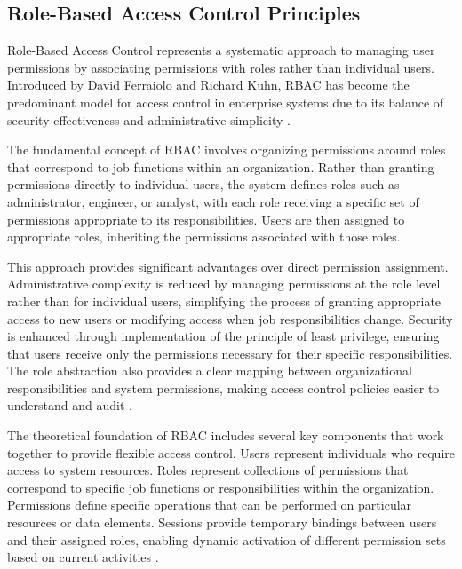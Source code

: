 \subsection{Role-Based Access Control Principles}
\label{subsec:rbac-principles}

Role-Based Access Control represents a systematic approach to managing user permissions by associating permissions with roles rather than individual users. Introduced by David Ferraiolo and Richard Kuhn, \ac{RBAC} has become the predominant model for access control in enterprise systems due to its balance of security effectiveness and administrative simplicity \cite{sandhu1998role}.

The fundamental concept of \ac{RBAC} involves organizing permissions around roles that correspond to job functions within an organization. Rather than granting permissions directly to individual users, the system defines roles such as administrator, engineer, or analyst, with each role receiving a specific set of permissions appropriate to its responsibilities. Users are then assigned to appropriate roles, inheriting the permissions associated with those roles.

This approach provides significant advantages over direct permission assignment. Administrative complexity is reduced by managing permissions at the role level rather than for individual users, simplifying the process of granting appropriate access to new users or modifying access when job responsibilities change. Security is enhanced through implementation of the principle of least privilege, ensuring that users receive only the permissions necessary for their specific responsibilities. The role abstraction also provides a clear mapping between organizational responsibilities and system permissions, making access control policies easier to understand and audit \cite{ferraiolo2011policy}.

The theoretical foundation of \ac{RBAC} includes several key components that work together to provide flexible access control. Users represent individuals who require access to system resources. Roles represent collections of permissions that correspond to specific job functions or responsibilities within the organization. Permissions define specific operations that can be performed on particular resources or data elements. Sessions provide temporary bindings between users and their assigned roles, enabling dynamic activation of different permission sets based on current activities \cite{sandhu1997arbac97}.

